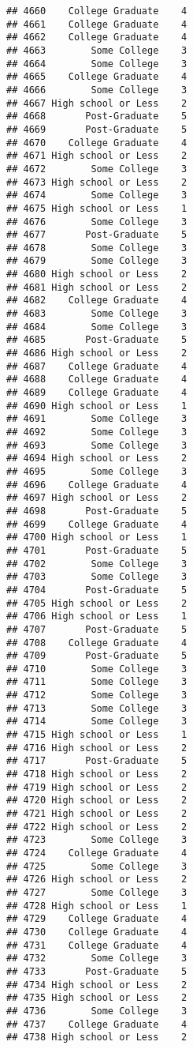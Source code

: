 \documentclass[
]{article}
\begin{document}
\begin{verbatim}
## 4660    College Graduate    4
## 4661    College Graduate    4
## 4662    College Graduate    4
## 4663        Some College    3
## 4664        Some College    3
## 4665    College Graduate    4
## 4666        Some College    3
## 4667 High school or Less    2
## 4668       Post-Graduate    5
## 4669       Post-Graduate    5
## 4670    College Graduate    4
## 4671 High school or Less    2
## 4672        Some College    3
## 4673 High school or Less    2
## 4674        Some College    3
## 4675 High school or Less    1
## 4676        Some College    3
## 4677       Post-Graduate    5
## 4678        Some College    3
## 4679        Some College    3
## 4680 High school or Less    2
## 4681 High school or Less    2
## 4682    College Graduate    4
## 4683        Some College    3
## 4684        Some College    3
## 4685       Post-Graduate    5
## 4686 High school or Less    2
## 4687    College Graduate    4
## 4688    College Graduate    4
## 4689    College Graduate    4
## 4690 High school or Less    1
## 4691        Some College    3
## 4692        Some College    3
## 4693        Some College    3
## 4694 High school or Less    2
## 4695        Some College    3
## 4696    College Graduate    4
## 4697 High school or Less    2
## 4698       Post-Graduate    5
## 4699    College Graduate    4
## 4700 High school or Less    1
## 4701       Post-Graduate    5
## 4702        Some College    3
## 4703        Some College    3
## 4704       Post-Graduate    5
## 4705 High school or Less    2
## 4706 High school or Less    1
## 4707       Post-Graduate    5
## 4708    College Graduate    4
## 4709       Post-Graduate    5
## 4710        Some College    3
## 4711        Some College    3
## 4712        Some College    3
## 4713        Some College    3
## 4714        Some College    3
## 4715 High school or Less    1
## 4716 High school or Less    2
## 4717       Post-Graduate    5
## 4718 High school or Less    2
## 4719 High school or Less    2
## 4720 High school or Less    2
## 4721 High school or Less    2
## 4722 High school or Less    2
## 4723        Some College    3
## 4724    College Graduate    4
## 4725        Some College    3
## 4726 High school or Less    2
## 4727        Some College    3
## 4728 High school or Less    1
## 4729    College Graduate    4
## 4730    College Graduate    4
## 4731    College Graduate    4
## 4732        Some College    3
## 4733       Post-Graduate    5
## 4734 High school or Less    2
## 4735 High school or Less    2
## 4736        Some College    3
## 4737    College Graduate    4
## 4738 High school or Less    2

\end{verbatim}
\end{document}

